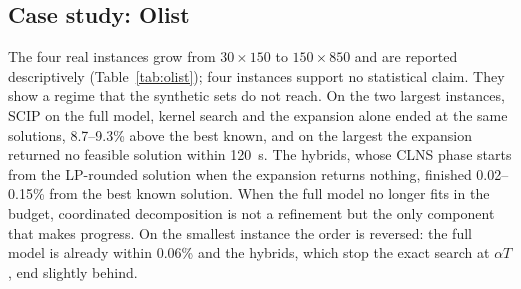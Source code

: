 \begin{table}[t]\centering\small
\caption{Holmberg instances (71, $T=30$~s). $P$: mean primal integral with 95\% bootstrap
interval; \emph{Mean dev.}: mean deviation from the published optimum; \emph{Optimum}: instances
in which the published optimum was reached (in every seed); \emph{Certified}: instances in which
the expansion proved optimality by reduced costs before its last stage.}\label{tab:holmberg}
\end{table}

\subsection{Case study: Olist}\label{sec:res-olist}
The four real instances grow from $30\times150$ to $150\times850$ and are reported descriptively
(Table~\ref{tab:olist}); four instances support no statistical claim. They show a regime that
the synthetic sets do not reach. On the two largest instances, SCIP on the full model, kernel
search and the expansion alone ended at the same solutions, 8.7--9.3\% above the best known,
and on the largest the expansion returned no feasible solution within 120~s. The hybrids,
whose CLNS phase starts from the LP-rounded solution when the expansion returns nothing, finished
0.02--0.15\% from the best known solution. When the full model no longer fits in the budget,
coordinated decomposition is not a refinement but the only component that makes progress. On the
smallest instance the order is reversed: the full model is already within 0.06\% and the hybrids,
which stop the exact search at $\alpha T$, end slightly behind.

